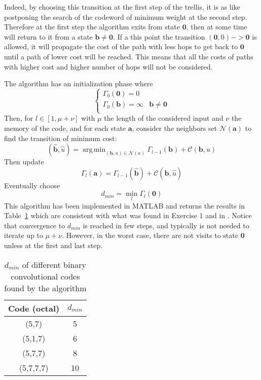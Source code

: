\documentclass[10pt]{article}
\DeclareMathOperator*{\argmin}{arg\,min}
\begin{document}
Indeed, by choosing this transition at the first step of the trellis, it is as like postponing the search of the codeword of minimum weight at the second step. Therefore at the first step the algorithm exits from state $\mathbf{0}$, then at some time will return to it from a state $\mathbf{b} \ne \mathbf{0}$. If a this point the transition $(\mathbf{0}, 0)->\mathbf{0}$ is allowed, it will propagate the cost of the path with less hops to get back to $\mathbf{0}$ until a path of lower cost will be reached. This means that all the costs of paths with higher cost and higher number of hops will not be considered.

The algorithm has an initialization phase where 
\begin{equation}
\begin{cases}
	\Gamma_0(\mathbf{0}) = 0 \\
	\Gamma_0(\mathbf{b}) = \infty & \mathbf{b} \ne \mathbf{0} \\

\end{cases}
\end{equation}	
Then, for $l \in [1, \mu + \nu]$ with $\mu$ the length of the considered input and $\nu$ the memory of the code, and for each state $\mathbf{a}$, consider the neighbors set $\mathcal{N}(\mathbf{a})$ to find the transition of minimum cost:
\begin{equation}
	(\mathbf{\hat{b}}, \hat{u}) = \argmin_{(\mathbf{b}, u) \in \mathcal{N}(a)} \Gamma_{l-1}(\mathbf{b}) + \mathcal{C}(\mathbf{b}, u)
\end{equation}
Then update 
\begin{equation}
	\Gamma_{l}(\mathbf{a}) = \Gamma_{l-1}(\mathbf{\hat{b}}) + \mathcal{C}(\mathbf{\hat{b}}, \hat{u})
\end{equation}
Eventually choose 
\begin{equation}
	d_{min} = \min_{l} \Gamma_l(\mathbf{0})
\end{equation}
This algorithm has been implemented in MATLAB and returns the results in Table~\ref{table:dmin} which are consistent with what was found in Exercise 1 and in \cite{proakis}. Notice that convergence to $d_{min}$ is reached in few steps, and typically is not needed to iterate up to $\mu + \nu$. However, in the worst case, there are not visits to state $\mathbf{0}$ unless at the first and last step.
\begin{table}
	\centering
	\begin{tabular}{c|c}
		\toprule
		Code (octal) & $d_{min}$ \\
		\midrule
		(5,7) & 5 \\
		(5,1,7) & 6 \\
		(5,7,7) & 8 \\
		(5,7,7,7) & 10 \\
	\end{tabular}
	\caption{$d_{min}$ of different binary convolutional codes found by the algorithm}
	\label{table:dmin}
\end{table}
\end{document}
